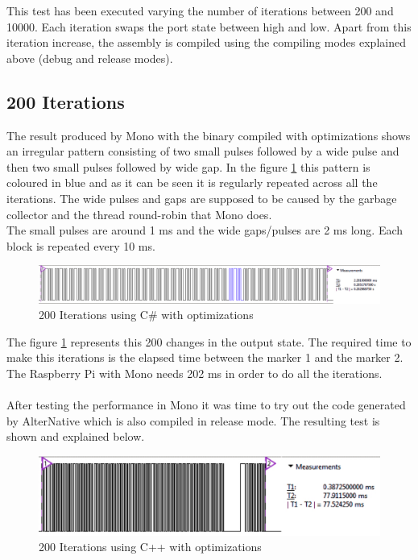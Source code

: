 This test has been executed varying the number of iterations between 200 and 10000. Each iteration swaps the port state between high and low. Apart from this iteration increase, the assembly is compiled using the compiling modes explained above (debug and release modes).

\subsection{200 Iterations}\label{SS:200-iterations}
The result produced by Mono with the binary compiled with optimizations shows an irregular pattern consisting of two small pulses followed by a wide pulse and then two small pulses followed by wide gap. In the figure \ref{fig:gpio-200it-csharp} this pattern is coloured in blue and as it can be seen it is regularly repeated across all the iterations. The wide pulses and gaps are supposed to be caused by the garbage collector and the thread round-robin that Mono does.
\\
The small pulses are around 1 ms and the wide gaps/pulses are 2 ms long. Each block is repeated every 10 ms.
\begin{figure}[H]\begin{center}
 \centering
  \captionsetup{justification=centering}
  \includegraphics[scale=0.35]{pictures/performance-tests/GPIO/200/csharp2}
  \caption{200 Iterations using C\# with optimizations\label{fig:gpio-200it-csharp}}
\end{center}\end{figure}
The figure \ref{fig:gpio-200it-csharp} represents this 200 changes in the output state. The required time to make this iterations is the elapsed time between the marker 1 and the marker 2. The Raspberry Pi with Mono needs 202 ms in order to do all the iterations.
\\
\\
After testing the performance in Mono it was time to try out the code generated by AlterNative which is also compiled in release mode. The resulting test is shown and explained below.
\begin{figure}[H]\begin{center}
 \centering
  \captionsetup{justification=centering}
  \includegraphics[scale=0.35]{pictures/performance-tests/GPIO/200/cxx}
  \caption{200 Iterations using C++ with optimizations \label{fig:gpio-200it-cxx}}
\end{center}\end{figure}
